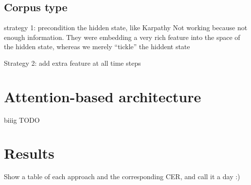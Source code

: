 
	\subsection{Corpus type}
		strategy 1: precondition the hidden state, like Karpathy
		Not working because not enough information. They were embedding a very rich feature into the space of the hidden state, whereas we merely ``tickle'' the hiddent state

		Strategy 2: add extra feature at all time steps


\section{Attention-based architecture}\label{sec:attention}
	biiig TODO


\section{Results}\label{sec:transcription_results}

		Show a table of each approach and the corresponding CER, and call it a day :)

\stopToDo{}


